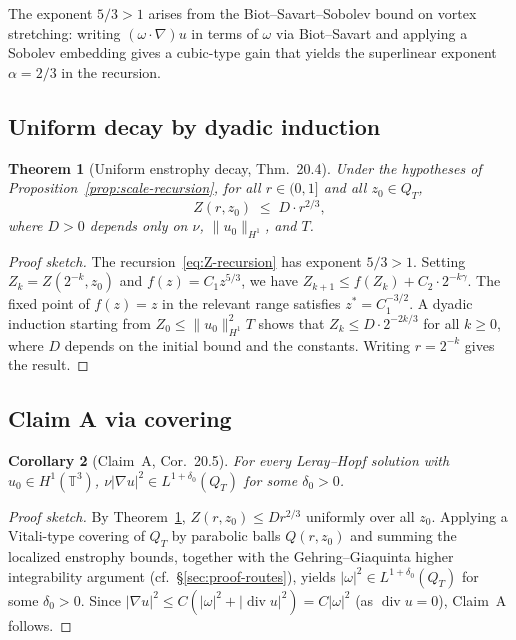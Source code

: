 \documentclass[11pt]{article}
\newtheorem{theorem}{Theorem}[section]
\newtheorem{corollary}[theorem]{Corollary}
\theoremstyle{definition}
\theoremstyle{remark}
\newcommand{\T}{\mathbb{T}}
\newcommand{\grad}{\nabla}
\newcommand{\divg}{\operatorname{div}}
\newcommand{\dlt}{\delta}
\begin{document}
The exponent $5/3 > 1$ arises from the Biot--Savart--Sobolev bound on
vortex stretching: writing $(\omega\cdot\grad)u$ in terms of $\omega$ via
Biot--Savart and applying a Sobolev embedding gives a cubic-type gain
that yields the superlinear exponent $\alpha = 2/3$ in the recursion.

\subsection{Uniform decay by dyadic induction}

\begin{theorem}[Uniform enstrophy decay, \cite{TFirstProof2026} Thm.~20.4]
  \label{thm:Z-uniform}
  Under the hypotheses of Proposition~\ref{prop:scale-recursion}, for all
  $r\in(0,1]$ and all $z_0\in Q_T$,
  \[
    Z(r,z_0) \;\leq\; D\cdot r^{2/3},
  \]
  where $D>0$ depends only on $\nu$, $\|u_0\|_{H^1}$, and $T$.
\end{theorem}
\begin{proof}[Proof sketch]
  The recursion~\eqref{eq:Z-recursion} has exponent $5/3>1$.  Setting
  $Z_k = Z(2^{-k},z_0)$ and $f(z)=C_1 z^{5/3}$, we have $Z_{k+1}\leq f(Z_k)+C_2\cdot 2^{-k\gamma}$.
  The fixed point of $f(z)=z$ in the relevant range satisfies $z^*=C_1^{-3/2}$.
  A dyadic induction starting from $Z_0\leq\|u_0\|_{H^1}^2 T$ shows that
  $Z_k\leq D\cdot 2^{-2k/3}$ for all $k\geq 0$, where $D$ depends on
  the initial bound and the constants.  Writing $r=2^{-k}$ gives the result.
\end{proof}

\subsection{Claim A via covering}

\begin{corollary}[Claim~A, \cite{TFirstProof2026} Cor.~20.5]
  \label{cor:claimA-H1}
  For every Leray--Hopf solution with $u_0\in H^1(\T^3)$,
  $\nu|\grad u|^2\in L^{1+\dlt_0}(Q_T)$ for some $\dlt_0>0$.
\end{corollary}
\begin{proof}[Proof sketch]
  By Theorem~\ref{thm:Z-uniform}, $Z(r,z_0)\leq Dr^{2/3}$ uniformly over
  all $z_0$.  Applying a Vitali-type covering of $Q_T$ by parabolic balls
  $Q(r,z_0)$ and summing the localized enstrophy bounds, together with the
  Gehring--Giaquinta higher integrability argument
  (cf.\ §\ref{sec:proof-routes}), yields
  $|\omega|^2\in L^{1+\dlt_0}(Q_T)$ for some $\dlt_0>0$.
  Since $|\grad u|^2\leq C(|\omega|^2 + |\divg u|^2) = C|\omega|^2$
  (as $\divg u=0$), Claim~A follows.
\end{proof}
\end{document}
